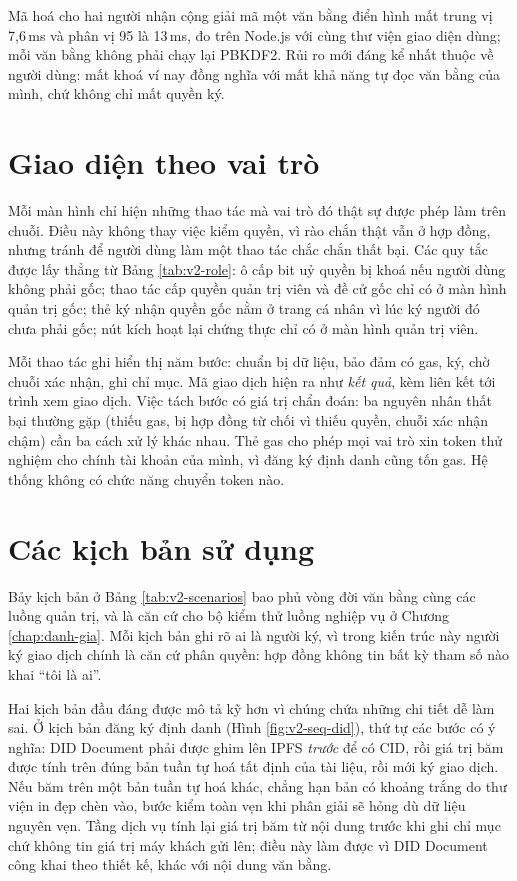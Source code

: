 Mã hoá cho hai người nhận cộng giải mã một văn bằng điển hình mất trung vị 7,6\,ms và phân vị 95 là 13\,ms, đo trên Node.js với cùng thư viện giao diện dùng; mỗi văn bằng không phải chạy lại PBKDF2. Rủi ro mới đáng kể nhất thuộc về người dùng: mất khoá ví nay đồng nghĩa với mất khả năng tự đọc văn bằng của mình, chứ không chỉ mất quyền ký.

\section{Giao diện theo vai trò}
\label{sec:giao-dien}

Mỗi màn hình chỉ hiện những thao tác mà vai trò đó thật sự được phép làm trên chuỗi. Điều này không thay việc kiểm quyền, vì rào chắn thật vẫn ở hợp đồng, nhưng tránh để người dùng làm một thao tác chắc chắn thất bại. Các quy tắc được lấy thẳng từ Bảng \ref{tab:v2-role}: ô cấp bit uỷ quyền bị khoá nếu người dùng không phải gốc; thao tác cấp quyền quản trị viên và đề cử gốc chỉ có ở màn hình quản trị gốc; thẻ ký nhận quyền gốc nằm ở trang cá nhân vì lúc ký người đó chưa phải gốc; nút kích hoạt lại chứng thực chỉ có ở màn hình quản trị viên.

Mỗi thao tác ghi hiển thị năm bước: chuẩn bị dữ liệu, bảo đảm có gas, ký, chờ chuỗi xác nhận, ghi chỉ mục. Mã giao dịch hiện ra như \emph{kết quả}, kèm liên kết tới trình xem giao dịch. Việc tách bước có giá trị chẩn đoán: ba nguyên nhân thất bại thường gặp (thiếu gas, bị hợp đồng từ chối vì thiếu quyền, chuỗi xác nhận chậm) cần ba cách xử lý khác nhau. Thẻ gas cho phép mọi vai trò xin token thử nghiệm cho chính tài khoản của mình, vì đăng ký định danh cũng tốn gas. Hệ thống không có chức năng chuyển token nào.

\section{Các kịch bản sử dụng}
\label{sec:kich-ban}

Bảy kịch bản ở Bảng \ref{tab:v2-scenarios} bao phủ vòng đời văn bằng cùng các luồng quản trị, và là căn cứ cho bộ kiểm thử luồng nghiệp vụ ở Chương \ref{chap:danh-gia}. Mỗi kịch bản ghi rõ ai là người ký, vì trong kiến trúc này người ký giao dịch chính là căn cứ phân quyền: hợp đồng không tin bất kỳ tham số nào khai ``tôi là ai''.



Hai kịch bản đầu đáng được mô tả kỹ hơn vì chúng chứa những chi tiết dễ làm sai. Ở kịch bản đăng ký định danh (Hình \ref{fig:v2-seq-did}), thứ tự các bước có ý nghĩa: DID Document phải được ghim lên IPFS \emph{trước} để có CID, rồi giá trị băm được tính trên đúng bản tuần tự hoá tất định của tài liệu, rồi mới ký giao dịch. Nếu băm trên một bản tuần tự hoá khác, chẳng hạn bản có khoảng trắng do thư viện in đẹp chèn vào, bước kiểm toàn vẹn khi phân giải sẽ hỏng dù dữ liệu nguyên vẹn. Tầng dịch vụ tính lại giá trị băm từ nội dung trước khi ghi chỉ mục chứ không tin giá trị máy khách gửi lên; điều này làm được vì DID Document công khai theo thiết kế, khác với nội dung văn bằng.

